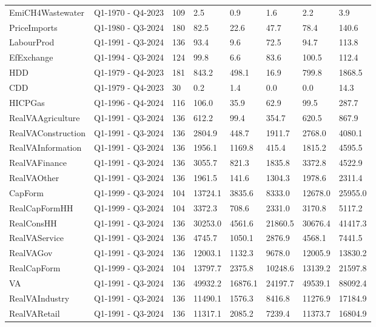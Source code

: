 \begin{longtable}[t]{llllllll}
\addlinespace
EmiCH4Wastewater & Q1-1970 - Q4-2023 & 109 & 2.5 & 0.9 & 1.6 & 2.2 & 3.9\\
PriceImports & Q1-1980 - Q3-2024 & 180 & 82.5 & 22.6 & 47.7 & 78.4 & 140.6\\
LabourProd & Q1-1991 - Q3-2024 & 136 & 93.4 & 9.6 & 72.5 & 94.7 & 113.8\\
EfExchange & Q1-1994 - Q3-2024 & 124 & 99.8 & 6.6 & 83.6 & 100.5 & 112.4\\
HDD & Q1-1979 - Q4-2023 & 181 & 843.2 & 498.1 & 16.9 & 799.8 & 1868.5\\
\addlinespace
CDD & Q1-1979 - Q4-2023 & 30 & 0.2 & 1.4 & 0.0 & 0.0 & 14.3\\
HICPGas & Q1-1996 - Q4-2024 & 116 & 106.0 & 35.9 & 62.9 & 99.5 & 287.7\\
RealVAAgriculture & Q1-1991 - Q3-2024 & 136 & 612.2 & 99.4 & 354.7 & 620.5 & 867.9\\
RealVAConstruction & Q1-1991 - Q3-2024 & 136 & 2804.9 & 448.7 & 1911.7 & 2768.0 & 4080.1\\
RealVAInformation & Q1-1991 - Q3-2024 & 136 & 1956.1 & 1169.8 & 415.4 & 1815.2 & 4595.5\\
\addlinespace
RealVAFinance & Q1-1991 - Q3-2024 & 136 & 3055.7 & 821.3 & 1835.8 & 3372.8 & 4522.9\\
RealVAOther & Q1-1991 - Q3-2024 & 136 & 1961.5 & 141.6 & 1304.3 & 1978.6 & 2311.4\\
CapForm & Q1-1999 - Q3-2024 & 104 & 13724.1 & 3835.6 & 8333.0 & 12678.0 & 25955.0\\
RealCapFormHH & Q1-1999 - Q3-2024 & 104 & 3372.3 & 708.6 & 2331.0 & 3170.8 & 5117.2\\
RealConsHH & Q1-1991 - Q3-2024 & 136 & 30253.0 & 4561.6 & 21860.5 & 30676.4 & 41417.3\\
\addlinespace
RealVAService & Q1-1991 - Q3-2024 & 136 & 4745.7 & 1050.1 & 2876.9 & 4568.1 & 7441.5\\
RealVAGov & Q1-1991 - Q3-2024 & 136 & 12003.1 & 1132.3 & 9678.0 & 12005.9 & 13830.2\\
RealCapForm & Q1-1999 - Q3-2024 & 104 & 13797.7 & 2375.8 & 10248.6 & 13139.2 & 21597.8\\
VA & Q1-1991 - Q3-2024 & 136 & 49932.2 & 16876.1 & 24197.7 & 49539.1 & 88092.4\\
RealVAIndustry & Q1-1991 - Q3-2024 & 136 & 11490.1 & 1576.3 & 8416.8 & 11276.9 & 17184.9\\
\addlinespace
RealVARetail & Q1-1991 - Q3-2024 & 136 & 11317.1 & 2085.2 & 7239.4 & 11373.7 & 16804.9\\

\end{longtable}
